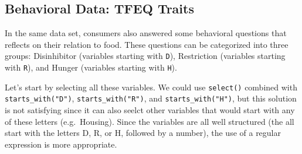 \documentclass[
]{book}
\newenvironment{Shaded}{\begin{snugshade}}{\end{snugshade}}
\newcommand{\AttributeTok}[1]{\textcolor[rgb]{0.77,0.63,0.00}{#1}}
\newcommand{\ControlFlowTok}[1]{\textcolor[rgb]{0.13,0.29,0.53}{\textbf{#1}}}
\newcommand{\DecValTok}[1]{\textcolor[rgb]{0.00,0.00,0.81}{#1}}
\newcommand{\FunctionTok}[1]{\textcolor[rgb]{0.00,0.00,0.00}{#1}}
\newcommand{\NormalTok}[1]{#1}
\newcommand{\OtherTok}[1]{\textcolor[rgb]{0.56,0.35,0.01}{#1}}
\newcommand{\SpecialCharTok}[1]{\textcolor[rgb]{0.00,0.00,0.00}{#1}}
\newcommand{\StringTok}[1]{\textcolor[rgb]{0.31,0.60,0.02}{#1}}
\begin{document}
\begin{Shaded}
\end{Shaded}

\hypertarget{behavioral-data-tfeq-traits}{%
\subsection{Behavioral Data: TFEQ Traits}\label{behavioral-data-tfeq-traits}}

In the same data set, consumers also answered some behavioral questions that reflects on their relation to food. These questions can be categorized into three groups: Disinhibitor (variables starting with \texttt{D}), Restriction (variables starting with \texttt{R}), and Hunger (variables starting with \texttt{H}).

Let's start by selecting all these variables. We could use \texttt{select()} combined with \texttt{starts\_with("D")}, \texttt{starts\_with("R")}, and \texttt{starts\_with("H")}, but this solution is not satisfying since it can also seelct other variables that would start with any of these letters (e.g.~Housing). Since the variables are all well structured (the all start with the letters D, R, or H, followed by a number), the use of a regular expression is more appropriate.
\end{document}
